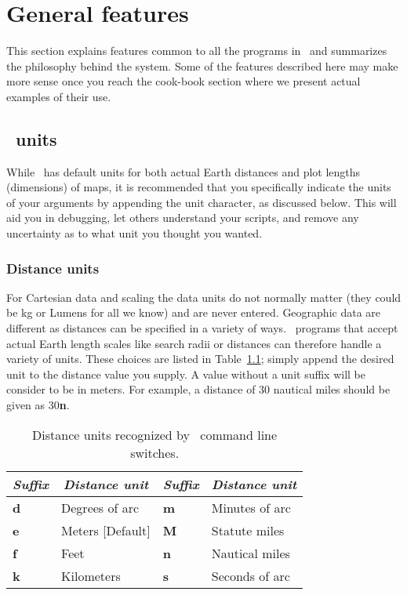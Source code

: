 %
%
\chapter{General features}
\label{ch:4}
\thispagestyle{headings}

This section explains features common to all the programs
in \GMT\ and summarizes the philosophy behind the system.  Some
of the features described here may make more sense once you reach
the cook-book section where we present actual examples of their use.

\section{\gmt\ units}

While \GMT\ has default units for both actual Earth distances and
plot lengths (dimensions) of maps, it is recommended that you specifically indicate
the units of your arguments by appending the unit character, as discussed below.
This will aid you in debugging, let others understand your scripts, and remove
any uncertainty as to what unit you thought you wanted.

\subsection{Distance units}

For Cartesian data and scaling the data units do not normally matter (they could be
kg or Lumens for all we know) and are never entered.  Geographic data are different
as distances can be specified in a variety of ways.  \GMT\ programs that accept actual
Earth length scales like search radii or distances can therefore
handle a variety of units.  These choices are listed in Table~\ref{tbl:distunits};
simply append the desired unit to the distance value you supply.  A value without
a unit suffix will be consider to be in meters.  For example, a distance of
30 nautical miles should be given as 30\textbf{n}.
\begin{table}[H]
\centering
{}%
%
\begin{tabular}{|l|l||l|l|} \hline
\multicolumn{1}{|c|}{\emph{Suffix}} & \multicolumn{1}{c|}{\emph{Distance unit}} & \multicolumn{1}{|c|}{\emph{Suffix}} & \multicolumn{1}{c|}{\emph{Distance unit}} \\ \hline
\textbf{d}	&	Degrees of arc		& \textbf{m}	&	Minutes of arc  \\ \hline
\textbf{e}	&	Meters [Default]	& \textbf{M}	&	Statute miles   \\ \hline
\textbf{f}	&	Feet 			& \textbf{n}	&	Nautical miles  \\ \hline
\textbf{k}	&	Kilometers		& \textbf{s}	&	Seconds of arc  \\ \hline
\end{tabular}
\caption{Distance units recognized by \gmt\ command line switches.}
\label{tbl:distunits}
\end{table}

